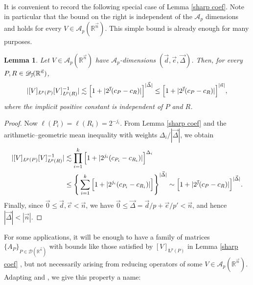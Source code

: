 \documentclass[11pt, reqno]{amsart}
\newtheorem{lemma}[theorem]{Lemma}
\theoremstyle{definition}
\theoremstyle{remark}
\numberwithin{equation}{section}
\newcommand{\A}{\mathscr A}
\newcommand{\D}{\mathscr D}
\newcommand{\R}{\mathbb R}
\newcommand{\vnull}{\vec 0}
\newcommand{\vd}{\vec d}
\newcommand{\vDe}{\vec{\Delta}}
\newcommand{\ve}{\vec e}
\newcommand{\vj}{\vec{\textit{\j}}}
\newcommand{\vn}{\vec n}
\newcommand{\aveL}{\textit{\L}}
\newcommand{\abs}[1]{|#1|}
\begin{document}
It is convenient to record the following special case of Lemma \ref{sharp coef}. Note in particular that the bound on the right is independent of the $\A_p$ dimensions and holds for every $V\in\A_p(\R^{\vn})$. This simple bound is already enough for many purposes.

\begin{lemma}\label{sharp coef 2}
Let $V\in\A_{p}(\R^{\vn})$ have $\A_p$-dimensions $(\vd,\ve,\vDe)$.
Then, for every $P,R\in\D_{\vj}(\R^{\vn})$,
\begin{equation*}
\abs{[V]_{\aveL^{p}(P)}[V]_{\aveL^{p}(R)}^{-1}}
\lesssim\Big[1+\abs{2^{\vj}(c_P-c_R)}\Big]^{\abs{\vDe}}
\leq\Big[1+\abs{2^{\vj}(c_P-c_R)}\Big]^{|\vn|},
\end{equation*}
where the implicit positive constant is independent of $P$ and $R$.
\end{lemma}

\begin{proof}
Now $\ell(P_i)=\ell(R_i)=2^{-j_i}$. From Lemma \ref{sharp coef} and the arithmetic--geometric mean inequality with weights $\Delta_i/\abs{\vDe}$, we obtain
\begin{equation*}
\begin{split}
\abs{[V]_{\aveL^{p}(P)}[V]_{\aveL^{p}(R)}^{-1}}
&\lesssim
\prod_{i=1}^k \Big[1+\abs{2^{j_i}(c_{P_i}-c_{R_i})}\Big]^{\Delta_i} \\
&\leq\Bigg\{\sum_{i=1}^k \Big[1+\abs{2^{j_i}(c_{P_i}-c_{R_i})}\Big]\Bigg\}^{\abs{\vDe}}
\sim\Big[1+\abs{2^{\vj}(c_P-c_R)}\Big]^{\abs{\vDe}}.
\end{split}
\end{equation*}
Finally, since $\vnull\leq\vd,\ve<\vn$, we have $\vnull\leq\vDe=\vd/p+\ve/p'<\vn$, and hence $\abs{\vDe}< |\vn|$.
\end{proof}

For some applications, it will be enough to have a family of matrices $\{A_P\}_{P\in\D(\R^{\vn})}$ with bounds like those satisfied by $[V]_{\aveL^p(P)}$ in Lemma \ref{sharp coef} , but not necessarily arising from reducing operators of some $V\in\A_p(\R^{\vn})$. Adapting \cite[Definition 1.3]{Roud04} and \cite[Definition 2.1]{FR21}, we give this property a name:
\end{document}
